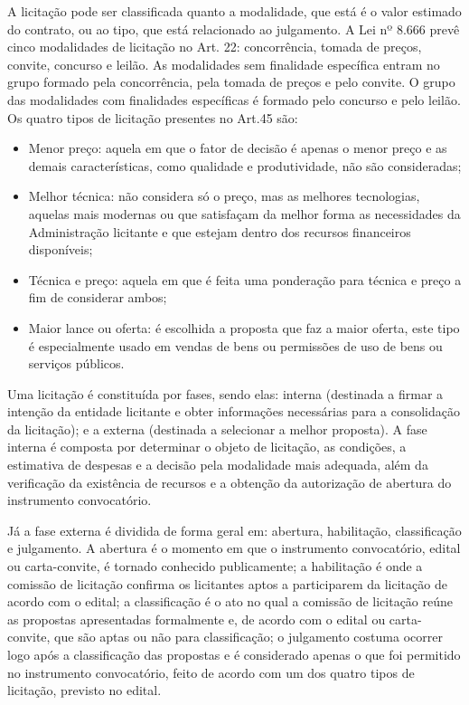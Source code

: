 A licitação pode ser classificada quanto a modalidade, que está é o valor estimado do contrato, ou ao tipo, que está relacionado ao julgamento. A Lei nº 8.666 prevê cinco modalidades de licitação no Art. 22: concorrência, tomada de preços, convite, concurso e leilão. As modalidades sem finalidade específica entram no grupo formado pela concorrência, pela tomada de preços e pelo convite. O grupo das modalidades com finalidades específicas é formado pelo concurso e pelo leilão. Os quatro tipos de licitação presentes no Art.45 são: 
\begin{itemize}
\item Menor preço: aquela em que o fator de decisão é apenas o menor preço e as demais características, como qualidade e produtividade, não são consideradas;
\item Melhor técnica: não considera só o preço, mas as melhores tecnologias, aquelas mais modernas ou que satisfaçam da melhor forma as necessidades da Administração licitante e que estejam dentro dos recursos financeiros disponíveis;
\item Técnica e preço: aquela em que é feita uma ponderação para técnica e preço a fim de considerar ambos;
\item Maior lance ou oferta: é escolhida a proposta que faz a maior oferta, este tipo é especialmente usado em vendas de bens ou permissões de uso de bens ou serviços públicos.
\end{itemize}

Uma licitação é constituída por fases, sendo elas: interna (destinada a firmar a intenção da entidade licitante e obter informações necessárias para a consolidação da licitação); e a externa (destinada a selecionar a melhor proposta). A fase interna é composta por determinar o objeto de licitação, as condições, a estimativa de despesas e a decisão pela modalidade mais adequada, além da verificação da existência de recursos e a obtenção da autorização de abertura do instrumento convocatório.

Já a fase externa é dividida de forma geral em: abertura, habilitação, classificação e julgamento.  A abertura é o momento em que o instrumento convocatório, edital ou carta-convite, é tornado conhecido publicamente; a habilitação é onde a comissão de licitação confirma os licitantes aptos a participarem da licitação de acordo com o edital; a classificação é o ato no qual a comissão de licitação reúne as propostas apresentadas formalmente e, de acordo com o edital ou carta-convite, que são aptas ou não para classificação; o julgamento costuma ocorrer logo após a classificação das propostas e é considerado apenas o que foi permitido no instrumento convocatório, feito de acordo com um dos quatro tipos de licitação, previsto no edital. 


